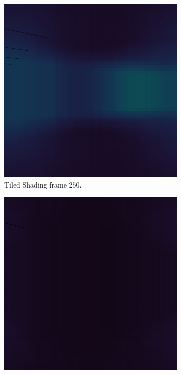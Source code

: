 \begin{figure}[t]
  \begin{subfigure}[b]{0.35\textwidth}
    \includegraphics[width=\textwidth]{./img/raw/lc-frame-example/ts/si_frame_250.png}
    \caption{Tiled Shading frame $250$.}
    \vspace{2pt}
    \label{fig:cs-test-frames-example:zc:250ts}
  \end{subfigure}\quad %
  \begin{subfigure}[b]{0.35\textwidth}
    \includegraphics[width=\textwidth]{./img/raw/lc-frame-example/cs/si_frame_250.png}

\end{subfigure}
\end{figure}
